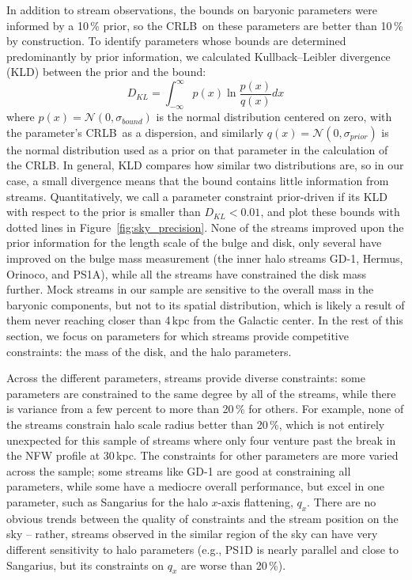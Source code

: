 \documentclass[modern]{aastex62}
\newcommand{\acronym}[1]{{\small{#1}}}
\newcommand{\CRLB}{\acronym{CRLB}}
\begin{document}
In addition to stream observations, the bounds on baryonic parameters were informed by a 10\,\% prior, so the \CRLB\ on these parameters are better than 10\,\% by construction.
To identify parameters whose bounds are determined predominantly by prior information, we calculated Kullback--Leibler divergence (KLD) between the prior and the bound:
\begin{equation*}
D_{KL} = \int_{-\infty}^{\infty} p(x) \ln\frac{p(x)}{q(x)} dx
\end{equation*}
where $p(x) = \mathcal{N}(0,\sigma_{bound})$ is the normal distribution centered on zero, with the parameter's \CRLB\ as a dispersion, and similarly $q(x) = \mathcal{N}(0,\sigma_{prior})$ is the normal distribution used as a prior on that parameter in the calculation of the \CRLB.
In general, KLD compares how similar two distributions are, so in our case, a small divergence means that the bound contains little information from streams.
Quantitatively, we call a parameter constraint prior-driven if its KLD with respect to the prior is smaller than $D_{KL}<0.01$, and plot these bounds with dotted lines in Figure~\ref{fig:sky_precision}.
None of the streams improved upon the prior information for the length scale of the bulge and disk, only several have improved on the bulge mass measurement (the inner halo streams GD-1, Hermus, Orinoco, and PS1A), while all the streams have constrained the disk mass further.
Mock streams in our sample are sensitive to the overall mass in the baryonic components, but not to its spatial distribution, which is likely a result of them never reaching closer than 4\,kpc from the Galactic center.
In the rest of this section, we focus on parameters for which streams provide competitive constraints: the mass of the disk, and the halo parameters.

Across the different parameters, streams provide diverse constraints: some parameters are constrained to the same degree by all of the streams, while there is variance from a few percent to more than 20\,\% for others.
For example, none of the streams constrain halo scale radius better than 20\,\%, which is not entirely unexpected for this sample of streams where only four venture past the break in the NFW profile at 30\,kpc.
The constraints for other parameters are more varied across the sample; some streams like GD-1 are good at constraining all parameters, while some have a mediocre overall performance, but excel in one parameter, such as Sangarius for the halo $x$-axis flattening, $q_x$.
There are no obvious trends between the quality of constraints and the stream position on the sky -- rather, streams observed in the similar region of the sky can have very different sensitivity to halo parameters (e.g., PS1D is nearly parallel and close to Sangarius, but its constraints on $q_x$ are worse than 20\,\%).
\end{document}

